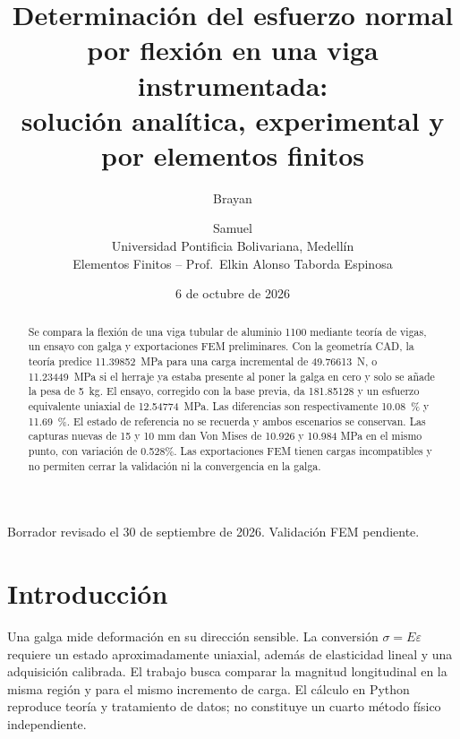 \documentclass[11pt,a4paper]{article}
\title{Determinaci\'on del esfuerzo normal por flexi\'on en una viga instrumentada:\\ soluci\'on anal\'itica, experimental y por elementos finitos}
\author{Brayan \pend{apellidos} \and Samuel \pend{apellidos}\\[2pt]
Universidad Pontificia Bolivariana, Medell\'in\\ Elementos Finitos -- Prof.\ Elkin Alonso Taborda Espinosa}
\date{6 de octubre de 2026}
\begin{document}
\maketitle
\begin{center}\small Borrador revisado el 30 de septiembre de 2026. Validación FEM pendiente.\end{center}

\begin{abstract}
Se compara la flexión de una viga tubular de aluminio 1100 mediante teoría de vigas, un ensayo con galga y exportaciones FEM preliminares. Con la geometría CAD, la teoría predice \SI{11.39852}{MPa} para una carga incremental de \SI{49.76613}{N}, o \SI{11.23449}{MPa} si el herraje ya estaba presente al poner la galga en cero y solo se añade la pesa de \SI{5}{kg}. El ensayo, corregido con la base previa, da \SI{181.85128}{\microstrain} y un esfuerzo equivalente uniaxial de \SI{12.54774}{MPa}. Las diferencias son respectivamente \SI{10.08}{\percent} y \SI{11.69}{\percent}. El estado de referencia no se recuerda y ambos escenarios se conservan. Las capturas nuevas de 15 y 10 mm dan Von Mises de 10.926 y 10.984 MPa en el mismo punto, con variación de 0.528\%. Las exportaciones FEM tienen cargas incompatibles y no permiten cerrar la validación ni la convergencia en la galga.
\end{abstract}

\section{Introducción}
Una galga mide deformación en su dirección sensible. La conversión $\sigma=E\varepsilon$ requiere un estado aproximadamente uniaxial, además de elasticidad lineal y una adquisición calibrada. El trabajo busca comparar la magnitud longitudinal en la misma región y para el mismo incremento de carga. El cálculo en Python reproduce teoría y tratamiento de datos; no constituye un cuarto método físico independiente.
\end{document}
